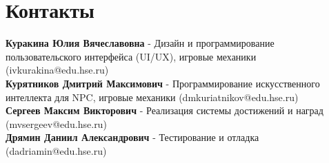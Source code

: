 \documentclass{article}
\begin{document}
\newpage

\section{Контакты}

\textbf{Куракина Юлия Вячеславовна} - Дизайн и программирование пользовательского интерфейса (UI/UX), игровые механики (ivkurakina@edu.hse.ru)\\
\textbf{Курятников Дмитрий Максимович} - Программирование искусственного интеллекта для NPC, игровые механики (dmkuriatnikov@edu.hse.ru)\\
\textbf{Сергеев Максим Викторович} - Реализация системы достижений и наград (mvsergeev@edu.hse.ru)\\
\textbf{Дрямин Даниил Александрович} - Тестирование и отладка (dadriamin@edu.hse.ru)\\
\end{document}
